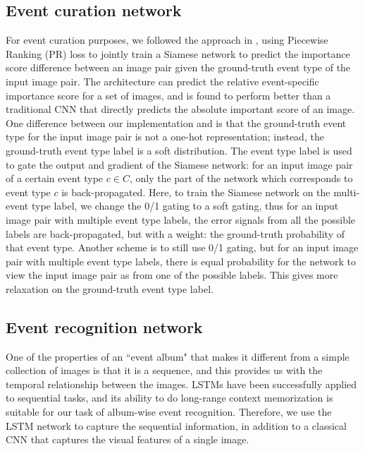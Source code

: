 \documentclass[runningheads]{llncs}
\begin{document}
\subsection{Event curation network}
\label{curation_section}

For event curation purposes, we followed the approach in \cite{CVPR}, using Piecewise Ranking (PR) loss to jointly train a Siamese network to predict the importance score difference between an image pair given the ground-truth event type of the input image pair. The architecture can predict the relative event-specific importance score for a set of images, and is found to perform better than a traditional CNN that directly predicts the absolute important score of an image.
One difference between our implementation and \cite{CVPR} is that the ground-truth event type for the input image pair  is not a one-hot representation; instead, the ground-truth event type label is a soft distribution. The event type label is used to gate the output and gradient of the Siamese network: for an input image pair of a certain event type $c \in C$, only the part of the network which corresponds to event type $c$ is back-propagated.  Here, to train the Siamese network on the multi-event type label, we change the 0/1 gating to a soft gating, thus for an input image pair with multiple event type labels, the error signals from all the possible labels are back-propagated, but with a weight: the ground-truth probability of that event type. Another scheme is to still use 0/1 gating, but for an input image pair with multiple event type labels, there is equal probability for the network to view the input image pair as from one of the possible labels. This gives more relaxation on the ground-truth event type label.
\subsection{Event recognition network}
One of the properties of  an ``event album" that makes it different from a simple collection of images is that it is a sequence, and this provides us with the temporal relationship between the images. LSTMs have been successfully applied to sequential tasks, and its ability to do long-range context memorization is suitable for our task of album-wise event recognition. Therefore, we use the LSTM network to capture the sequential information, in addition to a classical CNN that captures the visual features of a single image. 
\end{document}
